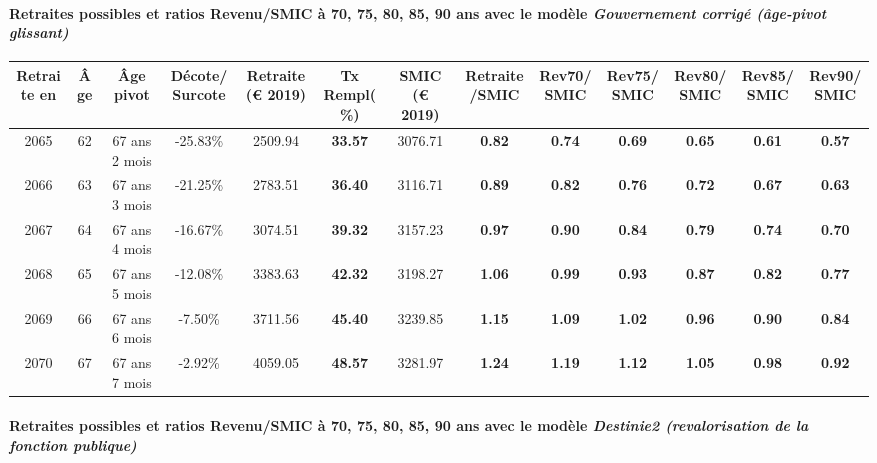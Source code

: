 \paragraph{Retraites possibles et ratios Revenu/SMIC à 70, 75, 80, 85, 90 ans avec le modèle \emph{Gouvernement corrigé (âge-pivot glissant)}}  
 
{ \scriptsize \begin{center} 
\begin{tabular}[htb]{|c|c||c|c||c|c||c||c|c|c|c|c|c|} 
\hline 
 Retraite en &  Âge &  Âge pivot &  Décote/Surcote &  Retraite (\euro{} 2019) &  Tx Rempl(\%) &  SMIC (\euro{} 2019) &  Retraite/SMIC &  Rev70/SMIC &  Rev75/SMIC &  Rev80/SMIC &  Rev85/SMIC &  Rev90/SMIC \\ 
\hline \hline 
 2065 &  62 &  67 ans 2 mois &  -25.83\% &  2509.94 &  {\bf 33.57} &  3076.71 &  {\bf {\color{red} 0.82}} &  {\bf {\color{red} 0.74}} &  {\bf {\color{red} 0.69}} &  {\bf {\color{red} 0.65}} &  {\bf {\color{red} 0.61}} &  {\bf {\color{red} 0.57}} \\ 
\hline 
 2066 &  63 &  67 ans 3 mois &  -21.25\% &  2783.51 &  {\bf 36.40} &  3116.71 &  {\bf {\color{red} 0.89}} &  {\bf {\color{red} 0.82}} &  {\bf {\color{red} 0.76}} &  {\bf {\color{red} 0.72}} &  {\bf {\color{red} 0.67}} &  {\bf {\color{red} 0.63}} \\ 
\hline 
 2067 &  64 &  67 ans 4 mois &  -16.67\% &  3074.51 &  {\bf 39.32} &  3157.23 &  {\bf {\color{red} 0.97}} &  {\bf {\color{red} 0.90}} &  {\bf {\color{red} 0.84}} &  {\bf {\color{red} 0.79}} &  {\bf {\color{red} 0.74}} &  {\bf {\color{red} 0.70}} \\ 
\hline 
 2068 &  65 &  67 ans 5 mois &  -12.08\% &  3383.63 &  {\bf 42.32} &  3198.27 &  {\bf 1.06} &  {\bf {\color{red} 0.99}} &  {\bf {\color{red} 0.93}} &  {\bf {\color{red} 0.87}} &  {\bf {\color{red} 0.82}} &  {\bf {\color{red} 0.77}} \\ 
\hline 
 2069 &  66 &  67 ans 6 mois &  -7.50\% &  3711.56 &  {\bf 45.40} &  3239.85 &  {\bf 1.15} &  {\bf 1.09} &  {\bf 1.02} &  {\bf {\color{red} 0.96}} &  {\bf {\color{red} 0.90}} &  {\bf {\color{red} 0.84}} \\ 
\hline 
 2070 &  67 &  67 ans 7 mois &  -2.92\% &  4059.05 &  {\bf 48.57} &  3281.97 &  {\bf 1.24} &  {\bf 1.19} &  {\bf 1.12} &  {\bf 1.05} &  {\bf {\color{red} 0.98}} &  {\bf {\color{red} 0.92}} \\ 
\hline 
\hline 
\end{tabular} 
\end{center} } 
\paragraph{Retraites possibles et ratios Revenu/SMIC à 70, 75, 80, 85, 90 ans avec le modèle \emph{Destinie2 (revalorisation de la fonction publique)}}  
 
